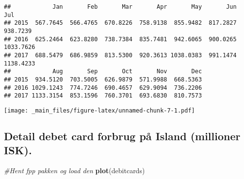 \documentclass[]{book}
\newenvironment{Shaded}{\begin{snugshade}}{\end{snugshade}}
\newcommand{\CommentTok}[1]{\textcolor[rgb]{0.56,0.35,0.01}{\textit{#1}}}
\newcommand{\DataTypeTok}[1]{\textcolor[rgb]{0.13,0.29,0.53}{#1}}
\newcommand{\DecValTok}[1]{\textcolor[rgb]{0.00,0.00,0.81}{#1}}
\newcommand{\KeywordTok}[1]{\textcolor[rgb]{0.13,0.29,0.53}{\textbf{#1}}}
\newcommand{\NormalTok}[1]{#1}
\newcommand{\OperatorTok}[1]{\textcolor[rgb]{0.81,0.36,0.00}{\textbf{#1}}}
\newcommand{\StringTok}[1]{\textcolor[rgb]{0.31,0.60,0.02}{#1}}
\begin{document}
\begin{verbatim}
##            Jan       Feb       Mar       Apr       May       Jun       Jul
## 2015  567.7645  566.4765  670.8226  758.9138  855.9482  817.2827  938.7239
## 2016  625.2464  623.8280  738.7384  835.7481  942.6065  900.0265 1033.7626
## 2017  688.5479  686.9859  813.5300  920.3613 1038.0383  991.1474 1138.4233
##            Aug       Sep       Oct       Nov       Dec
## 2015  934.5120  703.5005  626.9879  571.9988  668.5363
## 2016 1029.1243  774.7246  690.4657  629.9094  736.2206
## 2017 1133.3154  853.1596  760.3701  693.6830  810.7573
\end{verbatim}

\begin{Shaded}
\end{Shaded}

\texttt{[image: \_main\_files/figure-latex/unnamed-chunk-7-1.pdf]}

\hypertarget{detail-debet-card-forbrug-pa-island-millioner-isk.}{%
\subsection{Detail debet card forbrug på Island (millioner ISK).}\label{detail-debet-card-forbrug-pa-island-millioner-isk.}}

\begin{Shaded}
\begin{Highlighting}[]
\CommentTok{#Hent fpp pakken og load den}
\KeywordTok{plot}\NormalTok{(debitcards)}
\end{Highlighting}
\end{Shaded}
\end{document}
